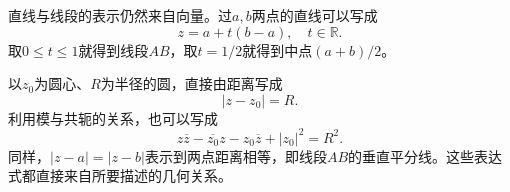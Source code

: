 直线与线段的表示仍然来自向量。过\(a , b\)两点的直线可以写成
\begin{equation}
    z = a + t \left( b - a \right) , \quad t \in \mathbb{R} .
\end{equation}
取\(0 \le t \le 1\)就得到线段\(A B\)，取\(t = 1 / 2\)就得到中点\(\left( a + b \right) / 2\)。

以\(z_{0}\)为圆心、\(R\)为半径的圆，直接由距离写成
\begin{equation}
    \left| z - z_{0} \right| = R .
\end{equation}
利用模与共轭的关系，也可以写成
\begin{equation}
    z \overline{z} - \overline{z_{0}} z - z_{0} \overline{z} + \left| z_{0} \right|^{2} = R^{2} .
\end{equation}
同样，\(\left| z - a \right| = \left| z - b \right|\)表示到两点距离相等，即线段\(A B\)的垂直平分线。这些表达式都直接来自所要描述的几何关系。

